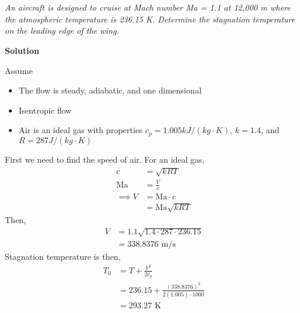 \section{}

\textit{An aircraft is designed to cruise at Mach number Ma = 1.1 at 12,000 m where the atmospheric temperature is 236.15 K. Determine the stagnation temperature on the leading edge of the wing.}

\textbf{Solution}

Assume
\begin{itemize}
    \item The flow is steady, adiabatic, and one dimensional
    \item Isentropic flow
    \item Air is an ideal gas with properties $c_p = 1.005 kJ/(kg \cdot K)$, $k = 1.4$, and $R = 287 J/(kg \cdot K)$
\end{itemize}
First we need to find the speed of air. For an ideal gas,
\begin{align*}
    c &= \sqrt{kRT} \\
    \text{Ma} &= \frac{V}{c} \\
    \implies V &= \text{Ma} \cdot c \\
    &= \text{Ma} \sqrt{kRT} 
\end{align*}
Then,
\begin{align*}
    V &= 1.1 \sqrt{1.4 \cdot 287 \cdot 236.15} \\
    &= 338.8376 \text{ m/s}
\end{align*}
Stagnation temperature is then,
\begin{align*}
    T_0 &= T + \frac{V^2}{2c_p} \\
    &= 236.15 + \frac{(338.8376)^2}{2(1.005) \cdot 1000} \\
    &= \boxed{293.27 \text{ K}}
\end{align*}